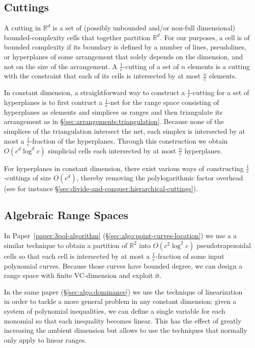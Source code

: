 \subsection{Cuttings}%
\label{sec:divide-and-conquer:cuttings}

A cutting in \(\mathbb{R}^d\)
is a set of (possibly unbounded and/or non-full dimensional)
bounded-complexity cells that together partition \(\mathbb{R}^{d}\).
%
For our purposes, a cell is of bounded complexity if its boundary is defined by
a number of lines, pseudolines, or hyperplanes of some arrangement
that solely depends on the dimension, and not on the size of the arrangement.
%
A \(\frac{1}{c}\)-cutting of a set of \(n\) elements is a cutting with the
constraint that each of its cells is intersected by at most \(\frac{n}{c}\)
elements.

In constant dimension,
a straightforward way to construct a \(\frac 1c\)-cutting for a set of
hyperplanes is to first contruct
a \(\frac 1c\)-net for the range space consisting of hyperplanes as elements
and simplices as ranges and then triangulate its arrangement as in
\S\ref{sec:arrangements:triangulation}. Because none of the simplices of the
triangulation intersect the net, each simplex is intersected by at most a
\(\frac 1c\)-fraction of the hyperplanes.
%
Through this construction we obtain \(O(c^d \log^d c)\) simplicial cells each
intersected by at most \(\frac{n}{c}\) hyperplanes.

For hyperplanes in constant dimension,
there exist various ways of constructing \(\frac{1}{c}\)-cuttings of size
\(O(c^d)\), thereby removing the polylogarithmic factor overhead (see for
instance \S\ref{sec:divide-and-conquer:hierarchical-cuttings}).

\subsection{Algebraic Range Spaces}

In Paper~\ref{paper:3pol-algorithm} (\S\ref{sec:algo:point-curves-location}) we use a
a similar technique to obtain
a partition of \(\mathbb{R}^2\) into \(O(c^2 \log^2 c)\) pseudotrapezoidal
cells so that each cell is intersected by at most a \(\frac 1c\)-fraction of
some input polynomial curves. Because those curves have bounded degree, we can
design a range space with finite VC-dimension and exploit it.

In the same paper (\S\ref{sec:algo:dominance}) we use the technique of
linearization~\cite{YY85,AM94} in order to tackle a more general problem
in any constant dimension: given a system of polynomial inequalities, we can
define a single variable for each monomial so that each inequality becomes
linear. This has the effect of greatly increasing the ambient dimension but
allows to use the techniques that normally only apply to linear ranges.

